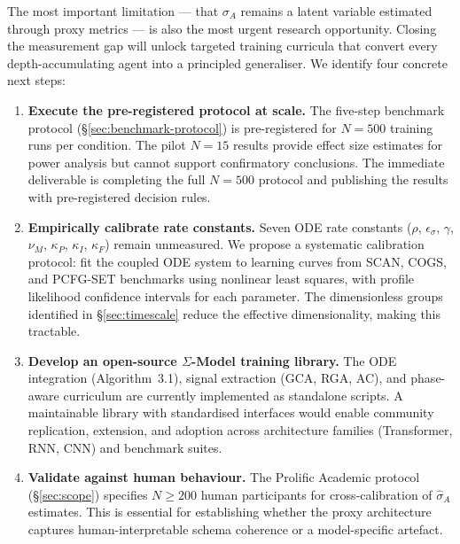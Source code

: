 \documentclass[10pt]{article}
\begin{document}
The most important limitation --- that $\sigma_A$ remains a latent
variable estimated through proxy metrics --- is also the most urgent
research opportunity. Closing the measurement gap will unlock targeted
training curricula that convert every depth-accumulating agent into a
principled generaliser. We identify four concrete next steps:

\begin{enumerate}[nosep]

\item \textbf{Execute the pre-registered protocol at scale.}
The five-step benchmark protocol (\S\ref{sec:benchmark-protocol}) is
pre-registered for $N = 500$ training runs per condition. The pilot
$N = 15$ results provide effect size estimates for power analysis but
cannot support confirmatory conclusions. The immediate deliverable is
completing the full $N = 500$ protocol and publishing the results with
pre-registered decision rules.

\item \textbf{Empirically calibrate rate constants.}
Seven ODE rate constants ($\rho$, $\epsilon_\sigma$, $\gamma$,
$\nu_M$, $\kappa_P$, $\kappa_I$, $\kappa_F$) remain unmeasured. We
propose a systematic calibration protocol: fit the coupled ODE system
to learning curves from SCAN, COGS, and PCFG-SET benchmarks using
nonlinear least squares, with profile likelihood confidence intervals
for each parameter. The dimensionless groups identified in
\S\ref{sec:timescale} reduce the effective dimensionality, making this
tractable.

\item \textbf{Develop an open-source $\Sigma$-Model training library.}
The ODE integration (Algorithm~3.1), signal extraction (GCA, RGA, AC),
and phase-aware curriculum are currently implemented as standalone
scripts. A maintainable library with standardised interfaces would
enable community replication, extension, and adoption across
architecture families (Transformer, RNN, CNN) and benchmark suites.

\item \textbf{Validate against human behaviour.}
The Prolific Academic protocol (\S\ref{sec:scope}) specifies $N \geq
200$ human participants for cross-calibration of $\hat{\sigma}_A$
estimates. This is essential for establishing whether the proxy
architecture captures human-interpretable schema coherence or a
model-specific artefact.

\end{enumerate}
\end{document}
